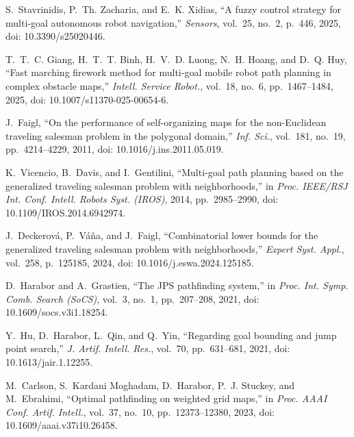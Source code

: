 S.~Stavrinidis, P.~Th. Zacharia, and E.~K. Xidias,
``A fuzzy control strategy for multi-goal autonomous robot navigation,''
\textit{Sensors}, vol.~25, no.~2, p.~446, 2025,
doi: 10.3390/s25020446.

T.~T.~C. Giang, H.~T.~T. Binh, H.~V.~D. Luong, N.~H. Hoang, and D.~Q. Huy,
``Fast marching firework method for multi-goal mobile robot path planning in complex obstacle maps,''
\textit{Intell. Service Robot.}, vol.~18, no.~6, pp.~1467--1484, 2025,
doi: 10.1007/s11370-025-00654-6.

J.~Faigl,
``On the performance of self-organizing maps for the non-Euclidean traveling salesman problem in the polygonal domain,''
\textit{Inf. Sci.}, vol.~181, no.~19, pp.~4214--4229, 2011,
doi: 10.1016/j.ins.2011.05.019.

K.~Vicencio, B.~Davis, and I.~Gentilini,
``Multi-goal path planning based on the generalized traveling salesman problem with neighborhoods,''
in \textit{Proc. IEEE/RSJ Int. Conf. Intell. Robots Syst. (IROS)}, 2014, pp.~2985--2990,
doi: 10.1109/IROS.2014.6942974.

J.~Deckerov\'a, P.~V\'a\v{n}a, and J.~Faigl,
``Combinatorial lower bounds for the generalized traveling salesman problem with neighborhoods,''
\textit{Expert Syst. Appl.}, vol.~258, p.~125185, 2024,
doi: 10.1016/j.eswa.2024.125185.


D.~Harabor and A.~Grastien,
``The JPS pathfinding system,''
in \textit{Proc. Int. Symp. Comb. Search (SoCS)}, vol.~3, no.~1, pp.~207--208, 2021,
doi: 10.1609/socs.v3i1.18254.

Y.~Hu, D.~Harabor, L.~Qin, and Q.~Yin,
``Regarding goal bounding and jump point search,''
\textit{J. Artif. Intell. Res.}, vol.~70, pp.~631--681, 2021,
doi: 10.1613/jair.1.12255.

M.~Carlson, S.~Kardani Moghadam, D.~Harabor, P.~J. Stuckey, and M.~Ebrahimi,
``Optimal pathfinding on weighted grid maps,''
in \textit{Proc. AAAI Conf. Artif. Intell.}, vol.~37, no.~10, pp.~12373--12380, 2023,
doi: 10.1609/aaai.v37i10.26458.



